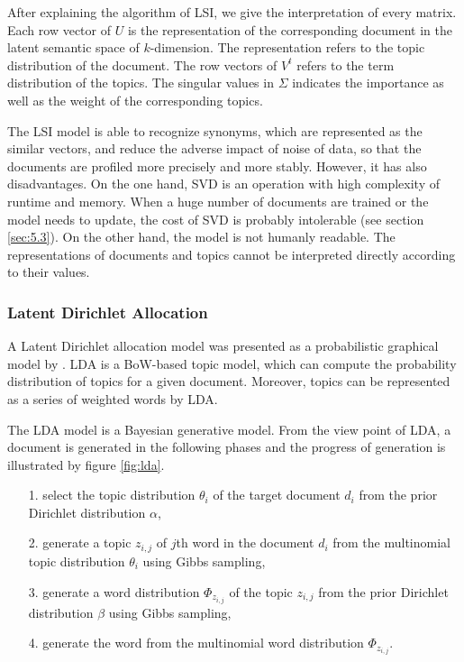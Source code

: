 After explaining the algorithm of LSI, we give the interpretation of every matrix. Each row vector of $U$ is the representation of the corresponding document in the latent semantic space of $k$-dimension. The representation refers to the topic distribution of the document. The row vectors of $V^t$ refers to the term distribution of the topics. The singular values in $\Sigma$ indicates the importance as well as the weight of the corresponding topics. 

The LSI model is able to recognize synonyms, which are represented as the similar vectors, and reduce the adverse impact of noise of data, so that the documents are profiled more precisely and more stably. However, it has also disadvantages. On the one hand, SVD is an operation with high complexity of runtime and memory. When a huge number of documents are trained or the model needs to update, the cost of SVD is probably intolerable (see section \ref{sec:5.3}). On the other hand, the model is not humanly readable. The representations of documents and topics cannot be interpreted directly according to their values. 

\subsubsection{Latent Dirichlet Allocation}

A Latent Dirichlet allocation model was presented as a probabilistic graphical model by \cite{Blei:2003}. LDA is a BoW-based topic model, which can compute the probability distribution of topics for a given document. Moreover, topics can be represented as a series of weighted words by LDA. 

The LDA model is a Bayesian generative model. From the view point of LDA, a document is generated in the following phases and the progress of generation is illustrated by figure \ref{fig:lda}.

\begin{itemize}
    \item[1.] select the topic distribution $\theta_i$ of the target document $d_i$ from the prior Dirichlet distribution $\alpha$, 
    \item[2.] generate a topic $z_{i,j}$ of $j$th word in the document $d_i$ from the multinomial topic distribution $\theta_i$ using Gibbs sampling,
    \item[3.] generate a word distribution $\Phi_{z_{i,j}}$ of the topic $z_{i,j}$ from the prior Dirichlet distribution $\beta$ using Gibbs sampling, 
    \item[4.] generate the word from the multinomial word distribution $\Phi_{z_{i,j}}$. 
\end{itemize}



